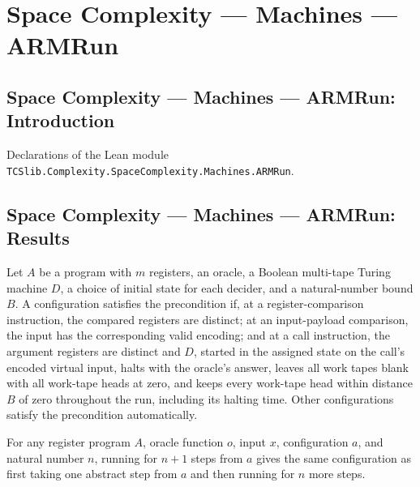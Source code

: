 \section{Space Complexity --- Machines --- ARMRun}
\subsection*{Space Complexity --- Machines --- ARMRun: Introduction}

Declarations of the Lean module \texttt{TCSlib.Complexity.SpaceComplexity.Machines.ARMRun}.

\subsection*{Space Complexity --- Machines --- ARMRun: Results}

\begin{definition}
\label{Complexity.LogProg.Pre}
\leanok
{}
Let $A$ be a program with $m$ registers, an oracle, a Boolean multi-tape Turing machine
$D$, a choice of initial state for each decider, and a natural-number bound $B$. A
configuration satisfies the precondition if, at a register-comparison instruction, the
compared registers are distinct; at an input-payload comparison, the input has the
corresponding valid encoding; and at a call instruction, the argument registers are
distinct and $D$, started in the assigned state on the call’s encoded virtual input,
halts with the oracle’s answer, leaves all work tapes blank with all work-tape heads at
zero, and keeps every work-tape head within distance $B$ of zero throughout the run,
including its halting time. Other configurations satisfy the precondition automatically.
\end{definition}

\begin{lemma}
\label{Complexity.LogProg.arun_succ}
\leanok
{}
For any register program $A$, oracle function $o$, input $x$, configuration $a$, and
natural number $n$, running for $n+1$ steps from $a$ gives the same configuration as
first taking one abstract step from $a$ and then running for $n$ more steps.
\end{lemma}

